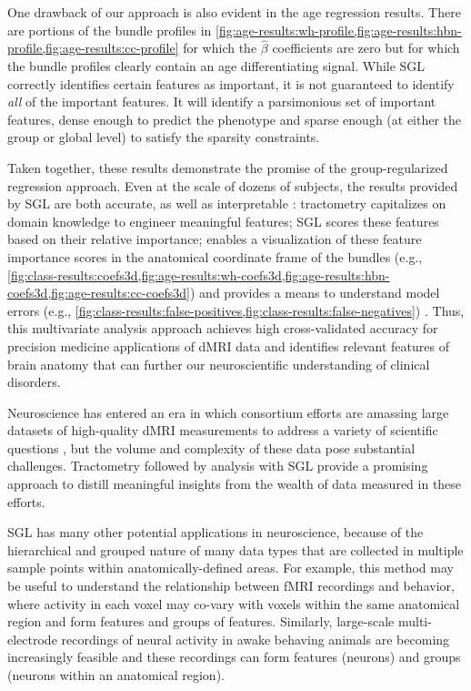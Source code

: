 \documentclass[10pt,%
               aps,%
               prl,%
               reprint,%
               superscriptaddress,%
               preprintnumbers,%
               linenumbers,%
               amsmath,%
               floatfix]{revtex4-1}
\begin{document}
One drawback of our approach is also evident in the age regression results.
There are portions of the bundle profiles in
\cref{fig:age-results:wh-profile,fig:age-results:hbn-profile,fig:age-results:cc-profile}
for which the $\hat{\beta}$ coefficients are zero but for which the bundle
profiles clearly contain an age differentiating signal. While SGL correctly
identifies certain features as important, it is not guaranteed to identify
\emph{all} of the important features. It will identify a parsimonious set of
important features, dense enough to predict the phenotype and sparse enough
(at either the group or global level) to satisfy the sparsity constraints.

Taken together, these results demonstrate the promise of the
group-regularized regression approach. Even at the scale of dozens of
subjects, the results provided by SGL are both accurate, as well as
interpretable \cite{Murdoch2019-ax}: tractometry capitalizes on domain
knowledge to engineer meaningful features; SGL scores these features based on
their relative importance; enables a visualization of these feature
importance scores in the anatomical coordinate frame of the bundles (e.g.,
\cref{fig:class-results:coefs3d,fig:age-results:wh-coefs3d,fig:age-results:hbn-coefs3d,fig:age-results:cc-coefs3d})
and provides a means to understand model errors (e.g.,
\cref{fig:class-results:false-positives,fig:class-results:false-negatives}) .
Thus, this multivariate analysis approach achieves high
cross-validated accuracy for precision medicine applications of dMRI data and identifies relevant features of brain anatomy that can further our
neuroscientific understanding of clinical disorders.

Neuroscience has entered an era in which consortium efforts are amassing
large datasets of high-quality dMRI measurements to address a variety of
scientific questions \cite{jernigan2016ping, jernigan2018abcd,
alexander2017open, Miller2016-hw, VanEssen2012}, but the volume and
complexity of these data pose substantial challenges. Tractometry
followed by analysis with SGL provide a promising approach to
distill meaningful insights from the wealth of data measured in these efforts.

SGL has many other potential applications in neuroscience, because
of the hierarchical and grouped nature of many data types that are
collected in multiple sample points within anatomically-defined areas.
For example, this method may be useful to understand the relationship
between fMRI recordings and behavior, where activity in each voxel
may co-vary with voxels within the same anatomical region and form
features and groups of features. Similarly, large-scale multi-electrode
recordings of neural activity in awake behaving animals are becoming
increasingly feasible \cite{steinmetz2018distributed, Jun2017-gv} and
these recordings can form features (neurons) and groups (neurons within
an anatomical region).
\end{document}
